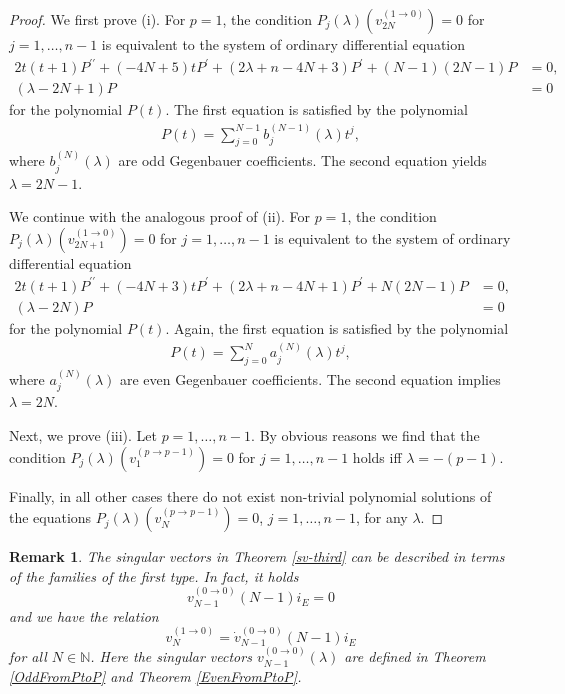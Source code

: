 \documentclass[a4paper,12pt,reqno]{amsart}
\newtheorem{bem}[theorem]{Remark}
\numberwithin{theorem}{subsection}
\numberwithin{equation}{section}
\begin{document}
\begin{proof} We first prove (i). For $p=1$, the condition $P_j(\lambda)(v_{2N}^{(1\to  0)})=0$
for $j=1,\ldots,n-1$ is equivalent to the system of ordinary differential
equation
\begin{align*}
      2t(t\!+\!1)P^{\prime\prime} + (-4N\!+\!5) t P^\prime + (2\lambda\!+\!n\!-\!4N\!+\!3) P^\prime
      +(N\!-\!1)(2N\!-\!1)P & = 0,\\
      (\lambda\!-\!2N\!+\!1)P & = 0
\end{align*}
for the polynomial $P(t)$. The first equation is satisfied by the polynomial
\begin{align*}
      P(t) = \sum_{j=0}^{N-1} b_j^{(N-1)}(\lambda) t^j,
\end{align*}
where $b_j^{(N)}(\lambda)$ are odd Gegenbauer coefficients. The second equation
yields $\lambda=2N-1$.

We continue with the analogous proof of (ii). For $p=1$, the condition
$P_j(\lambda)(v_{2N+1}^{(1\to 0)})=0$ for $j=1,\ldots,n-1$ is equivalent to the
system of ordinary differential equation
\begin{align*}
   2t(t\!+\!1)P^{\prime\prime} + (-4N\!+\!3) tP^\prime + (2\lambda\!+\!n\!-\!4N\!+\!1)P^\prime + N(2N\!-\!1)P & = 0,\\
   (\lambda\!-\!2N)P & = 0
    \end{align*}
for the polynomial $P(t)$. Again, the first equation is satisfied by the
polynomial
\begin{align*}
      P(t)=\sum_{j=0}^{N}a_j^{(N)}(\lambda) t^j,
\end{align*}
where $a_j^{(N)}(\lambda)$ are even Gegenbauer coefficients. The second
equation implies $\lambda=2N$.

Next, we prove (iii). Let $p=1,\ldots,n-1$. By obvious reasons we find that the
condition $P_j(\lambda)(v_{1}^{(p\to p-1)})=0$ for $j=1,\ldots,n-1$ holds iff
$\lambda=-(p-1)$.

Finally, in all other cases there do not exist non-trivial polynomial solutions
of the equations $P_j(\lambda)(v_N^{(p\to p-1)})=0$, $j=1,\ldots,n-1$, for any
$\lambda$.
\end{proof}

\begin{bem}\label{sv3-der} The singular vectors in Theorem \ref{sv-third} can be described in
terms of the families of the first type. In fact, it holds
\begin{equation}\label{sv-van-3}
   v_{N-1}^{(0 \to 0)}(N\!-\!1) i_E = 0
\end{equation}
and we have the relation
\begin{equation}
    v_N^{(1 \to 0)} = \dot{v}_{N-1}^{(0 \to 0)}(N\!-\!1) i_E
\end{equation}
for all $N \in {\mathbb{N}}$. Here the singular vectors $v_{N-1}^{(0 \to 0)}(\lambda)$
are defined in Theorem \ref{OddFromPtoP} and Theorem \ref{EvenFromPtoP}.
\end{bem}
\end{document}
